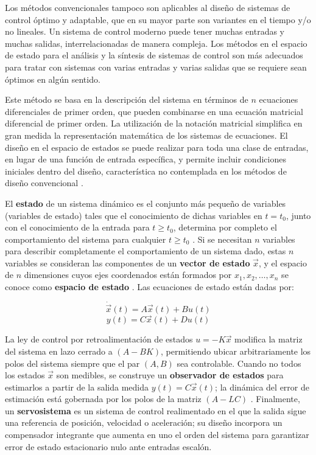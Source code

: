 \documentclass[conference]{IEEEtran}
\begin{document}
Los métodos convencionales tampoco son aplicables al diseño de sistemas de control óptimo y adaptable, que en su mayor parte son variantes en el tiempo y/o no lineales. Un sistema de control moderno puede tener muchas entradas y muchas salidas, interrelacionadas de manera compleja. Los métodos en el espacio de estado para el análisis y la síntesis de sistemas de control son más adecuados para tratar con sistemas con varias entradas y varias salidas que se requiere sean óptimos en algún sentido.

Este método se basa en la descripción del sistema en términos de $n$ ecuaciones diferenciales de primer orden, que pueden combinarse en una ecuación matricial diferencial de primer orden. La utilización de la notación matricial simplifica en gran medida la representación matemática de los sistemas de ecuaciones. El diseño en el espacio de estados se puede realizar para toda una clase de entradas, en lugar de una función de entrada específica, y permite incluir condiciones iniciales dentro del diseño, característica no contemplada en los métodos de diseño convencional \cite{ogata_discreto}.

El \textbf{estado} de un sistema dinámico es el conjunto más pequeño de variables (variables de estado) tales que el conocimiento de dichas variables en $t=t_0$, junto con el conocimiento de la entrada para $t\geq t_0$, determina por completo el comportamiento del sistema para cualquier $t \geq t_0$ \cite{ogata_discreto}. Si se necesitan $n$ variables para describir completamente el comportamiento de un sistema dado, estas $n$ variables se consideran las componentes de un \textbf{vector de estado} $\vec{x}$, y el espacio de $n$ dimensiones cuyos ejes coordenados están formados por $x_1, x_2, \dots, x_n$ se conoce como \textbf{espacio de estado} \cite{kuo_digital}. Las ecuaciones de estado están dadas por:

\begin{equation}
\dot{\vec{x}}(t) = A\vec{x}(t) + Bu(t)
\end{equation}
\begin{equation}
y(t) = C\vec{x}(t) + Du(t)
\end{equation}

La ley de control por retroalimentación de estados $u = -K\vec{x}$ modifica la matriz del sistema en lazo cerrado a $(A - BK)$, permitiendo ubicar arbitrariamente los polos del sistema siempre que el par $(A,B)$ sea controlable. Cuando no todos los estados $\vec{x}$ son medibles, se construye un \textbf{observador de estados} para estimarlos a partir de la salida medida $y(t) = C\vec{x}(t)$; la dinámica del error de estimación está gobernada por los polos de la matriz $(A - LC)$ \cite{unam_tutorial}. Finalmente, un \textbf{servosistema} es un sistema de control realimentado en el que la salida sigue una referencia de posición, velocidad o aceleración; su diseño incorpora un compensador integrante que aumenta en uno el orden del sistema para garantizar error de estado estacionario nulo ante entradas escalón.
\end{document}
